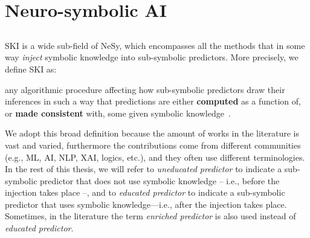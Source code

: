 
\chapter{Neuro-symbolic AI}
\label{ch:nesy-ai}
\minitoc

\section[Symbolic knowledge injection]{}\label{sec:ski}
%
\Gls{SKI} is a wide sub-field of \gls{NeSy}, which encompasses all the methods that in some way \emph{inject} symbolic knowledge into sub-symbolic predictors.
%
More precisely, we define \gls{SKI} as:
%
\begin{definition}
    \label{def:ski}
    any algorithmic procedure affecting how sub-symbolic predictors draw their inferences in such a way that predictions are either \textbf{computed} as a function of, or \textbf{made consistent} with, some given symbolic knowledge~\cite{DBLP:journals/csur/CiattoSAMO24}.
\end{definition}
%
We adopt this broad definition because the amount of works in the literature is vast and varied, furthermore the contributions come from different communities (e.g., \gls{ML}, \gls{AI}, \gls{NLP}, \gls{XAI}, logics, etc.), and they often use different terminologies.
%
In the rest of this thesis, we will refer to \emph{uneducated predictor} to indicate a sub-symbolic predictor that does not use symbolic knowledge -- i.e., before the injection takes place --, and to \emph{educated predictor} to indicate a sub-symbolic predictor that uses symbolic knowledge---i.e., after the injection takes place.
%
Sometimes, in the literature the term \emph{enriched predictor} is also used instead of \emph{educated predictor}.


